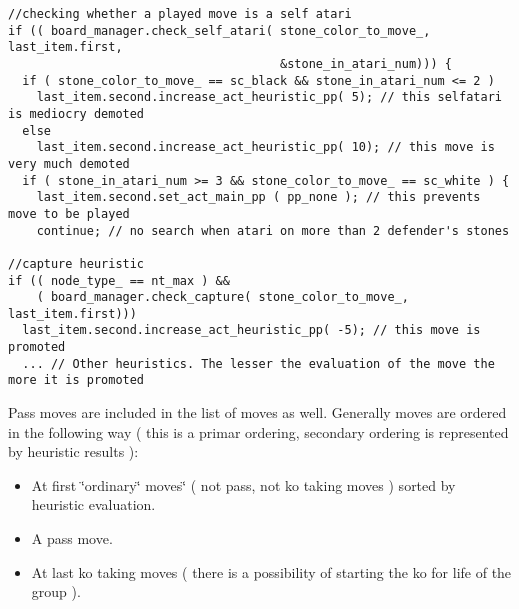 \footnotesize\begin{verbatim}//checking whether a played move is a self atari
if (( board_manager.check_self_atari( stone_color_to_move_, last_item.first, 
                                      &stone_in_atari_num))) {
  if ( stone_color_to_move_ == sc_black && stone_in_atari_num <= 2 ) 
    last_item.second.increase_act_heuristic_pp( 5); // this selfatari is mediocry demoted
  else 
    last_item.second.increase_act_heuristic_pp( 10); // this move is very much demoted 
  if ( stone_in_atari_num >= 3 && stone_color_to_move_ == sc_white ) {
    last_item.second.set_act_main_pp ( pp_none ); // this prevents move to be played 
    continue; // no search when atari on more than 2 defender's stones 

//capture heuristic
if (( node_type_ == nt_max ) && 
    ( board_manager.check_capture( stone_color_to_move_, last_item.first))) 
  last_item.second.increase_act_heuristic_pp( -5); // this move is promoted
  ... // Other heuristics. The lesser the evaluation of the move the more it is promoted
\end{verbatim}
\normalsize


Pass moves are included in the list of moves as well. Generally moves are ordered in the following way ( this is a primar ordering, secondary ordering is represented by heuristic results ):\begin{itemize}
\item At first \char`\"{}ordinary\char`\"{} moves\char`\"{} ( not pass, not ko taking moves ) sorted by heuristic evaluation.\item A pass move.\item At last ko taking moves ( there is a possibility of starting the ko for life of the group ).\end{itemize}


